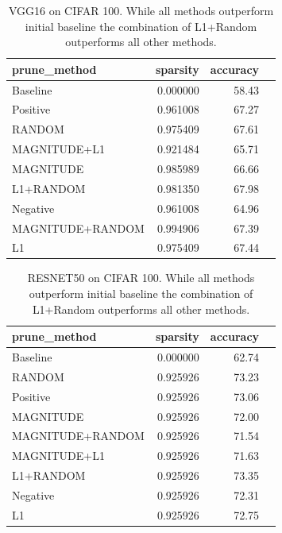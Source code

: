 \documentclass[runningheads]{llncs}
\begin{document}
\begin{table}[h]
\begin{tabular}{|l|r|r|r|}
\hline
     prune\_method &  sparsity &  accuracy \\ \hline 
        Baseline &  0.000000 &     58.43 \\ \hline
         Positive &  0.961008 &     67.27 \\ \hline
           RANDOM &  0.975409 &     67.61 \\ \hline
     MAGNITUDE+L1 &  0.921484 &     65.71 \\ \hline
        MAGNITUDE &  0.985989 &     66.66 \\ \hline
        L1+RANDOM &  0.981350 &     67.98 \\ \hline
         Negative &  0.961008 &     64.96 \\ \hline
 MAGNITUDE+RANDOM &  0.994906 &     67.39 \\ \hline
               L1 &  0.975409 &     67.44 \\ \hline
\end{tabular}
\label{tab:cifar100-VGG16}
\caption{VGG16 on CIFAR 100. While all methods outperform initial baseline the combination of L1+Random outperforms all other methods.}
\end{table}

\begin{table}[h]
\begin{tabular}{|l|r|r|r|}
\hline
     prune\_method &  sparsity &  accuracy \\ \hline
           Baseline &  0.000000 &     62.74 \\ \hline
           RANDOM &  0.925926 &     73.23 \\ \hline
         Positive &  0.925926 &     73.06 \\ \hline
        MAGNITUDE &  0.925926 &     72.00 \\ \hline
 MAGNITUDE+RANDOM &  0.925926 &     71.54 \\ \hline
     MAGNITUDE+L1 &  0.925926 &     71.63 \\ \hline
        L1+RANDOM &  0.925926 &     73.35 \\ \hline
         Negative &  0.925926 &     72.31 \\ \hline
               L1 &  0.925926 &     72.75 \\ \hline
\end{tabular}
\label{tab:cifar100-RESNET50}
\caption{RESNET50 on CIFAR 100. While all methods outperform initial baseline the combination of L1+Random outperforms all other methods.}
\end{table}
\end{document}
